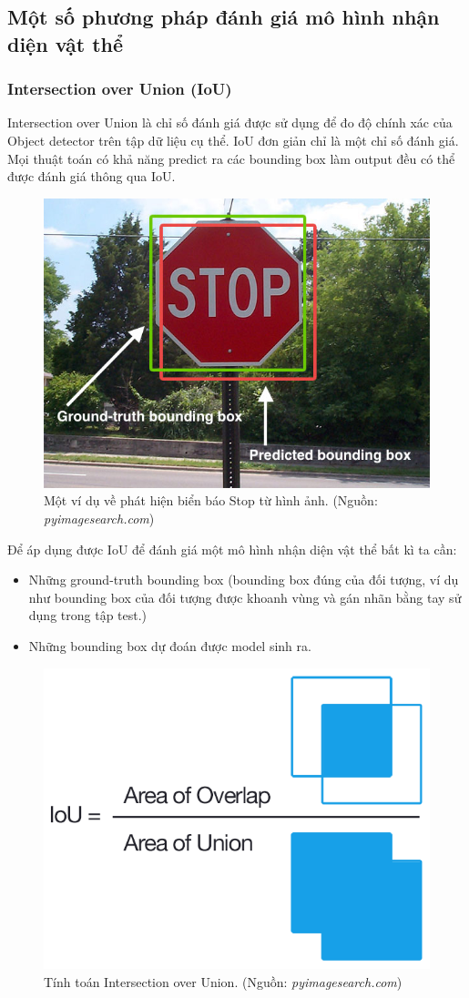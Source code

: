 \documentclass[a4paper, 12pt]{report}
\begin{document}
\subsection{Một số phương pháp đánh giá mô hình nhận diện vật thể}
\subsubsection{Intersection over Union (IoU)}
Intersection over Union là chỉ số đánh giá được sử dụng để đo độ chính xác của Object detector trên tập dữ liệu cụ thể. IoU đơn giản chỉ là một chỉ số đánh giá. Mọi thuật toán có khả năng predict ra các bounding box làm output đều có thể được đánh giá thông qua IoU. \par
\begin{figure}[!h]
	\centering
	\includegraphics[width=0.5\linewidth]{Images/iou1}
	\caption{Một ví dụ về phát hiện biển báo Stop từ hình ảnh. (Nguồn: \textit{pyimagesearch.com})}
	\label{fig:iou1}
\end{figure}
Để áp dụng được IoU để đánh giá một mô hình nhận diện vật thể bất kì ta cần:
\begin{itemize}
	\item Những ground-truth bounding box (bounding box đúng của đối tượng, ví dụ như bounding box của đối tượng được khoanh vùng và gán nhãn bằng tay sử dụng trong tập test.)
	\item Những bounding box dự đoán được model sinh ra.
\end{itemize}
\begin{figure}[!h]
	\centering
	\includegraphics[width=0.5\linewidth]{Images/iou3}
	\caption{Tính toán Intersection over Union. (Nguồn: \textit{pyimagesearch.com})}
	\label{fig:iou3}
\end{figure}
\end{document}
